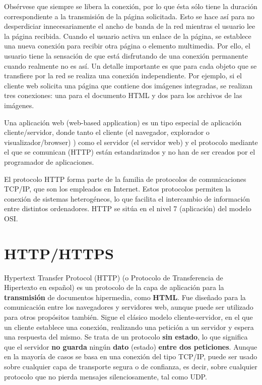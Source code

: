 Obsérvese que siempre se libera la conexión, por lo que ésta sólo tiene la duración
correspondiente a la transmisión de la página solicitada. Esto se hace así para no
desperdiciar innecesariamente el ancho de banda de la red mientras el usuario lee la
página recibida.
Cuando el usuario activa un enlace de la página, se establece una nueva conexión
para recibir otra página o elemento multimedia. Por ello, el usuario tiene la sensación
de que está disfrutando de una conexión permanente cuando realmente no es así.
Un detalle importante es que para cada objeto que se transfiere por la red se realiza
una conexión independiente. Por ejemplo, si el cliente web solicita una página que
contiene dos imágenes integradas, se realizan tres conexiones: una para el documento
HTML y dos para los archivos de las imágenes.

Una aplicación web (web-based application) es un tipo especial de aplicación cliente/servidor, donde tanto el cliente (el navegador, explorador o visualizador/browser)
) como
el servidor (el servidor web) y el protocolo mediante el que se comunican (HTTP)
están estandarizados y no han de ser creados por el programador de aplicaciones.

El protocolo HTTP forma parte de la familia de protocolos de comunicaciones
TCP/IP, que son los empleados en Internet. Estos protocolos permiten la conexión
de sistemas heterogéneos, lo que facilita el intercambio de información entre distintos
ordenadores. HTTP se sitúa en el nivel 7 (aplicación) del modelo OSI.


\section{HTTP/HTTPS}

\cite{mdn}Hypertext Transfer Protocol (HTTP) (o Protocolo de Transferencia de Hipertexto en español) es un protocolo de la capa de aplicación para la \textbf{transmisión} de documentos hipermedia, como \textbf{HTML}. Fue diseñado para la comunicación entre los navegadores y servidores web, aunque puede ser utilizado para otros propósitos también. Sigue el clásico modelo cliente-servidor, en el que un cliente establece una conexión, realizando una petición a un servidor y espera una respuesta del mismo. Se trata de un protocolo \textbf{sin estado}, lo que significa que el servidor \textbf{no guarda} ningún \textbf{dato} (estado) \textbf{entre dos peticiones}. Aunque en la mayoría de casos se basa en una conexión del tipo TCP/IP, puede ser usado sobre cualquier capa de transporte segura o de confianza, es decir, sobre cualquier protocolo que no pierda mensajes silenciosamente, tal como UDP.

